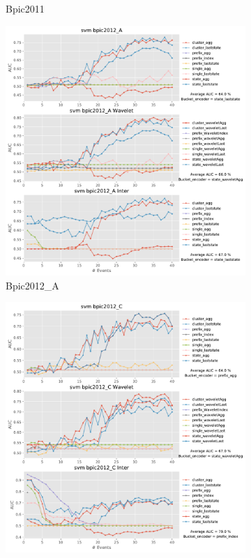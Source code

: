 \documentclass[twoside,11pt]{Latex/Classes/PhDthesisPSnPDF}
\begin{document}
\begin{figure}[!htbp]
\begin{subfigure}{0.48\textwidth}
		\caption{Bpic2011} \label{fig:b11i}
	\end{subfigure}	
	\medskip
	\begin{subfigure}{0.48\textwidth}
		\includegraphics[width=\linewidth]{images/inter/svm/bpic2012_A.pdf}
		\caption{Bpic2012\_A} \label{fig:b12ai}
	\end{subfigure}\hspace*{\fill}
	\begin{subfigure}{0.48\textwidth}
		\includegraphics[width=\linewidth]{images/inter/svm/bpic2012_C.pdf}

\end{subfigure}
\end{figure}
\end{document}
